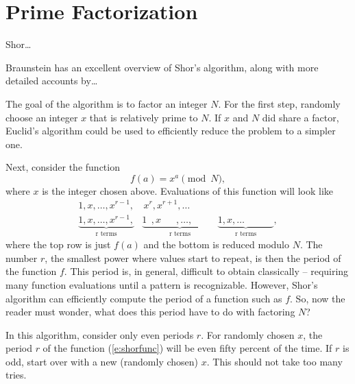\section{Prime Factorization}

Shor\dots

Braunstein\cite{Braunstein:96} has an excellent overview of Shor's algorithm,
along with more detailed accounts by\dots

The goal of the algorithm is to factor an integer $N$.
For the first step, randomly choose an integer $x$ that
is relatively prime to $N$.  If $x$ and $N$ did share a 
factor, Euclid's algorithm could be used to efficiently 
reduce the problem to a simpler one.

Next, consider the function
\begin{equation}
f(a) = x^a\pmod{N},
\label{e:shorfunc}
\end{equation}
where $x$ is the integer chosen above.
Evaluations of this function will look like
\begin{equation}
\begin{split}
1,x,\ldots,x^{r-1},             &\,x^r,x^{r+1},\ldots\\
\underbrace{1,x,\ldots,x^{r-1},}_{\text{r terms}}
&\underbrace{1^{\phantom{x}},x^{\phantom{r-1}},\ldots,\phantom{x^{r-1},}}_{\text{r terms}}
\underbrace{ 1,x,\ldots\phantom{,x^{r-1},}}_{\text{r terms}},
\end{split}
\end{equation}
where the top row is just $f(a)$ and the bottom is reduced modulo $N$.
The number $r$, the smallest power where values start to 
repeat, is then the period of the function $f$.
This period is, in general, difficult to obtain classically -- 
requiring many function evaluations until a pattern
is recognizable.  However, Shor's algorithm can efficiently compute the
period of a function such as $f$.  
So, now the reader must wonder, what does this period have to do with 
factoring $N$?

In this algorithm, consider only even periods $r$.
For randomly chosen $x$, the period $r$ of the function (\ref{e:shorfunc})
will be even fifty percent of the time.  If $r$ is odd, start over with
a new (randomly chosen) $x$.  This should not take too many 
tries\cite{Shor:94,Ekert/Jozsa:96}.

